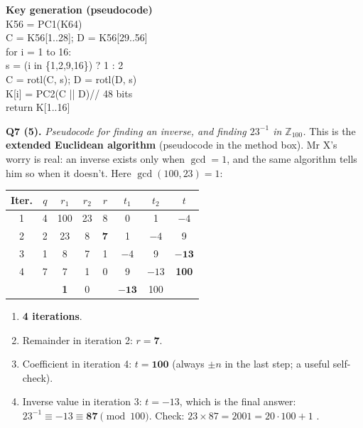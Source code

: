 \begin{minipage}[t]{0.48\textwidth}\small
\textbf{Key generation (pseudocode)}\\
\ttfamily K56 = PC1(K64)\\
C = K56[1..28]; D = K56[29..56]\\
for i = 1 to 16:\\
\hspace*{1em}s = (i in \{1,2,9,16\}) ? 1 : 2\\
\hspace*{1em}C = rotl(C, s); D = rotl(D, s)\\
\hspace*{1em}K[i] = PC2(C || D)\quad // 48 bits\\
return K[1..16]
\end{minipage}

\medskip
\textbf{Q7 (5).} \emph{Pseudocode for finding an inverse, and finding $23^{-1}$ in $\mathbb{Z}_{100}$.}
This is the \textbf{extended Euclidean algorithm} (pseudocode in the method box). Mr X's worry is real: an inverse exists only when $\gcd = 1$, and the same algorithm tells him so when it doesn't. Here $\gcd(100, 23) = 1$:
\begin{center}\small
\begin{tabular}{@{}cccccccc@{}}
\toprule
Iter. & $q$ & $r_1$ & $r_2$ & $r$ & $t_1$ & $t_2$ & $t$\\
\midrule
1 & 4 & 100 & 23 & 8 & 0 & 1 & $-4$\\
2 & 2 & 23 & 8 & \textbf{7} & 1 & $-4$ & 9\\
3 & 1 & 8 & 7 & 1 & $-4$ & 9 & $\mathbf{-13}$\\
4 & 7 & 7 & 1 & 0 & 9 & $-13$ & \textbf{100}\\
 & & \textbf{1} & 0 & & $\mathbf{-13}$ & 100 & \\
\bottomrule
\end{tabular}
\end{center}
\begin{enumerate}[leftmargin=1.5em]
  \item \textbf{4 iterations}.
  \item Remainder in iteration 2: $r = \mathbf{7}$.
  \item Coefficient in iteration 4: $t = \mathbf{100}$ (always $\pm n$ in the last step; a useful self-check).
  \item Inverse value in iteration 3: $t = -13$, which is the final answer: $23^{-1} \equiv -13 \equiv \mathbf{87} \pmod{100}$. Check: $23 \times 87 = 2001 = 20\cdot100 + 1$ \checkmark.
\end{enumerate}

